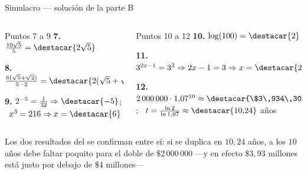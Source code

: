 \documentclass[aspectratio=169,10pt]{beamer}
\begin{document}
\begin{frame}{Simulacro — solución de la parte B}
  \scriptsize
  \begin{columns}[T,onlytextwidth]
    \begin{column}{0.49\textwidth}
      \begin{block}{Puntos 7 a 9}
        \tiny
        \textbf{7.} $\tfrac{10\sqrt5}{5} = \destacar{2\sqrt{5}}$

        \vspace{0.08cm}
        \textbf{8.} $\tfrac{6(\sqrt5+\sqrt2)}{5-2}
        = \destacar{2(\sqrt{5}+\sqrt{2})}$

        \vspace{0.08cm}
        \textbf{9.} $2^{-5}=\tfrac{1}{32} \Rightarrow \destacar{-5}$; \
        $x^{3}=216 \Rightarrow x=\destacar{6}$
      \end{block}
    \end{column}
    \begin{column}{0.49\textwidth}
      \begin{block}{Puntos 10 a 12}
        \tiny
        \textbf{10.} $\log(100) = \destacar{2}$

        \vspace{0.08cm}
        \textbf{11.} $3^{2x-1}=3^{3} \Rightarrow 2x-1=3
        \Rightarrow x=\destacar{2}$

        \vspace{0.08cm}
        \textbf{12.} $2\,000\,000\cdot 1{,}07^{10}
        \approx \destacar{\$3\,934\,303}$; \
        $t=\tfrac{\ln 2}{\ln 1{,}07} \approx \destacar{10{,}24}$ años
      \end{block}
    \end{column}
  \end{columns}

  \vspace{0.08cm}
  {\tiny\color{uniGris} Los dos resultados del  se confirman
  entre sí: si se duplica en $10{,}24$ años, a los $10$ años debe faltar
  poquito para el doble de $\$2\,000\,000$ —y en efecto $\$3{,}93$ millones
  está justo por debajo de $\$4$ millones— \checkmark}
\end{frame}
\end{document}
